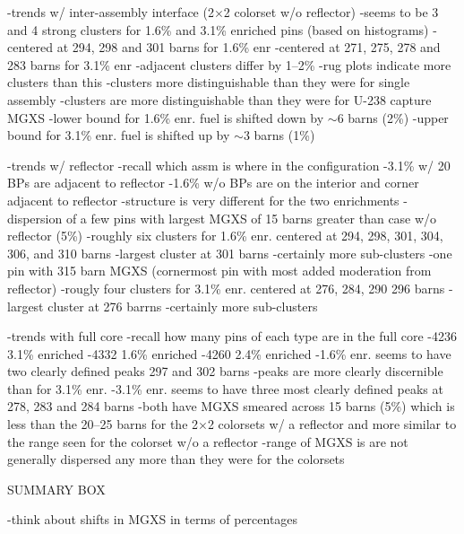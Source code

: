 -trends w/ inter-assembly interface (2$\times$2 colorset w/o reflector)
  -seems to be 3 and 4 strong clusters for 1.6\% and 3.1\% enriched pins (based on histograms)
    -centered at 294, 298 and 301 barns for 1.6\% enr
    -centered at 271, 275, 278 and 283 barns for 3.1\% enr
    -adjacent clusters differ by 1--2\%
  -rug plots indicate more clusters than this
  -clusters more distinguishable than they were for single assembly  
  -clusters are more distinguishable than they were for U-238 capture \ac{MGXS}
  -lower bound for 1.6\% enr. fuel is shifted down by $\sim$6 barns (2\%)
  -upper bound for 3.1\% enr. fuel is shifted up by $\sim$3 barns (1\%)

-trends w/ reflector
  -recall which assm is where in the configuration
    -3.1\% w/ 20 \acp{BP} are adjacent to reflector
    -1.6\% w/o \acp{BP} are on the interior and corner adjacent to reflector
  -structure is very different for the two enrichments
    -dispersion of a few pins with largest \ac{MGXS} of 15 barns greater than case w/o reflector (5\%)
  -roughly six clusters for 1.6\% enr. centered at 294, 298, 301, 304, 306, and 310 barns
    -largest cluster at 301 barns
    -certainly more sub-clusters
    -one pin with 315 barn \ac{MGXS} (cornermost pin with most added moderation from reflector)
  -rougly four clusters for 3.1\% enr. centered at 276, 284, 290 296 barns
    -largest cluster at 276 barrns
    -certainly more sub-clusters
  
-trends with full core
  -recall how many pins of each type are in the full core
    -4236 3.1\% enriched
    -4332 1.6\% enriched
    -4260 2.4\% enriched
  -1.6\% enr. seems to have two clearly defined peaks 297 and 302 barns
    -peaks are more clearly discernible than for 3.1\% enr.
  -3.1\% enr. seems to have three most clearly defined peaks at 278, 283 and 284 barns
  -both have \ac{MGXS} smeared across 15 barns (5\%) which is less than the 20--25 barns for the 2$\times$2 colorsets w/ a reflector and more similar to the range seen for the colorset w/o a reflector
  -range of \ac{MGXS} is are not generally dispersed any more than they were for the colorsets 

SUMMARY BOX

-think about shifts in \ac{MGXS} in terms of percentages

